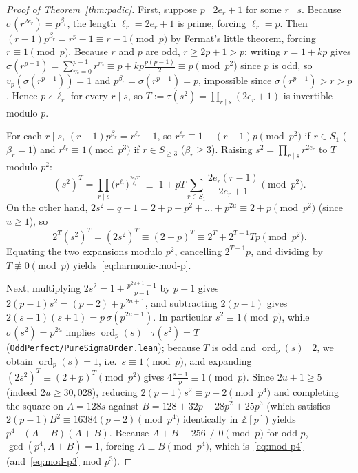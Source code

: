 \documentclass[11pt]{amsart}
\theoremstyle{definition}
\theoremstyle{remark}
\begin{document}
\begin{proof}[Proof of Theorem~\ref{thm:padic}]
First, suppose $p \mid 2 e_r + 1$ for some $r \mid s$. Because $\sigma(r^{2 e_r}) = p^{\beta_r}$, the length $\ell_r = 2 e_r + 1$ is prime, forcing $\ell_r = p$. Then $(r - 1) p^{\beta_r} = r^p - 1 \equiv r - 1 \pmod p$ by Fermat's little theorem, forcing $r \equiv 1 \pmod p$. Because $r$ and $p$ are odd, $r \ge 2p + 1 > p$; writing $r = 1 + kp$ gives $\sigma(r^{p - 1}) = \sum_{m=0}^{p-1} r^m \equiv p + kp\frac{p(p-1)}{2} \equiv p \pmod{p^2}$ since $p$ is odd, so $v_p(\sigma(r^{p-1})) = 1$ and $p^{\beta_r} = \sigma(r^{p-1}) = p$, impossible since $\sigma(r^{p-1}) > r > p$. Hence $p \nmid \ell_r$ for every $r \mid s$, so $T := \tau(s^2) = \prod_{r \mid s} (2 e_r + 1)$ is invertible modulo $p$.

For each $r \mid s$, $(r - 1) p^{\beta_r} = r^{\ell_r} - 1$, so $r^{\ell_r} \equiv 1 + (r - 1)p \pmod{p^2}$ if $r \in S_1$ ($\beta_r = 1$) and $r^{\ell_r} \equiv 1 \pmod{p^3}$ if $r \in S_{\ge 3}$ ($\beta_r \ge 3$). Raising $s^2 = \prod_{r \mid s} r^{2 e_r}$ to $T$ modulo $p^2$:
\[
  (s^2)^T = \prod_{r \mid s} \bigl(r^{\ell_r}\bigr)^{\frac{2 e_r T}{\ell_r}} \;\equiv\; 1 + p T \sum_{r \in S_1} \frac{2 e_r (r - 1)}{2 e_r + 1} \pmod{p^2}.
\]
On the other hand, $2 s^2 = q + 1 = 2 + p + p^2 + \dots + p^{2u} \equiv 2 + p \pmod{p^2}$ (since $u \ge 1$), so
\[
  2^T (s^2)^T = (2 s^2)^T \equiv (2 + p)^T \equiv 2^T + 2^{T - 1} T p \pmod{p^2}.
\]
Equating the two expansions modulo $p^2$, cancelling $2^{T - 1} p$, and dividing by $T \not\equiv 0 \pmod p$ yields~\eqref{eq:harmonic-mod-p}.

Next, multiplying $2 s^2 = 1 + \frac{p^{2u + 1} - 1}{p - 1}$ by $p - 1$ gives $2(p - 1) s^2 = (p - 2) + p^{2u + 1}$, and subtracting $2(p - 1)$ gives $2(s - 1)(s + 1) = p\,\sigma(p^{2u - 1})$. In particular $s^2 \equiv 1 \pmod p$, while $\sigma(s^2) = p^{2u}$ implies $\operatorname{ord}_p(s) \mid \tau(s^2) = T$ (\texttt{OddPerfect/PureSigmaOrder.lean}); because $T$ is odd and $\operatorname{ord}_p(s) \mid 2$, we obtain $\operatorname{ord}_p(s) = 1$, i.e.\ $s \equiv 1 \pmod p$, and expanding $(2 s^2)^T \equiv (2 + p)^T \pmod{p^2}$ gives $4\frac{s - 1}{p} \equiv 1 \pmod p$. Since $2u + 1 \ge 5$ (indeed $2u \ge 30{,}028$), reducing $2(p - 1)s^2 \equiv p - 2 \pmod{p^4}$ and completing the square on $A = 128 s$ against $B = 128 + 32p + 28p^2 + 25p^3$ (which satisfies $2(p - 1)B^2 \equiv 16384(p - 2) \pmod{p^4}$ identically in $\mathbb{Z}[p]$) yields $p^4 \mid (A - B)(A + B)$. Because $A + B \equiv 256 \not\equiv 0 \pmod p$ for odd $p$, $\gcd(p^4, A + B) = 1$, forcing $A \equiv B \pmod{p^4}$, which is~\eqref{eq:mod-p4} (and~\eqref{eq:mod-p3} mod $p^3$).


\end{proof}
\end{document}
